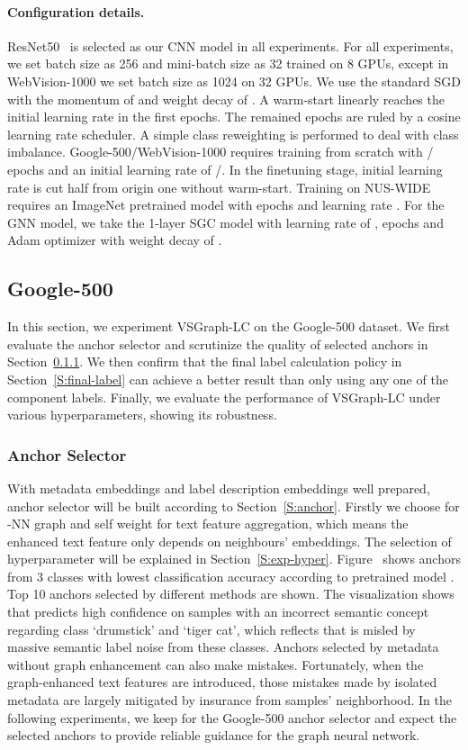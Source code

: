 \documentclass[sigconf]{acmart}
\begin{document}
\paragraph{Configuration details.}
ResNet50~\cite{he2016deep} is selected as our CNN model in all experiments.
For all experiments, we set batch size as 256 and mini-batch size as 32 trained on 8 GPUs, except in WebVision-1000 we set batch size as 1024 on 32 GPUs. We use the standard SGD with the momentum of  and weight decay of . A warm-start linearly reaches the initial learning rate in the first  epochs. The remained epochs are ruled by a cosine learning rate scheduler. A simple class reweighting is performed to deal with class imbalance. Google-500/WebVision-1000 requires training from scratch with / epochs and an initial learning rate of /. 
In the finetuning stage, initial learning rate is cut half from origin one without warm-start.
Training on NUS-WIDE requires an ImageNet pretrained model with  epochs and learning rate .
For the GNN model, we take the 1-layer SGC model with learning rate of ,  epochs and Adam optimizer with weight decay of .

\subsection{Google-500}
\label{sec:google-500}
In this section, we experiment VSGraph-LC on the Google-500 dataset. We first evaluate the anchor selector and scrutinize the quality of selected anchors in Section~\ref{S:exp-anchor}. We then confirm that the final label calculation policy in Section~\ref{S:final-label} can achieve a better result than only using any one of the component labels. Finally, we evaluate the performance of VSGraph-LC under various hyperparameters, showing its robustness.

\subsubsection{Anchor Selector}
\label{S:exp-anchor}
With metadata embeddings  and label description embeddings  well prepared, anchor selector will be built according to Section~\ref{S:anchor}. Firstly we choose  for -NN graph  and self weight  for text feature aggregation, which means the enhanced text feature only depends on neighbours' embeddings. The selection of hyperparameter will be explained in Section~\ref{S:exp-hyper}.
Figure~ shows anchors from 3 classes with lowest classification accuracy according to pretrained model . Top 10 anchors selected by different methods are shown. The visualization shows that  predicts high confidence on samples with an incorrect semantic concept regarding class `drumstick' and `tiger cat', which reflects that  is misled by massive semantic label noise from these classes. Anchors selected by metadata without graph enhancement can also make mistakes. Fortunately, when the graph-enhanced text features are introduced, those mistakes made by isolated metadata are largely mitigated by insurance from samples' neighborhood. 
In the following experiments, we keep  for the Google-500 anchor selector and expect the selected anchors to provide reliable guidance for the graph neural network.
\end{document}
